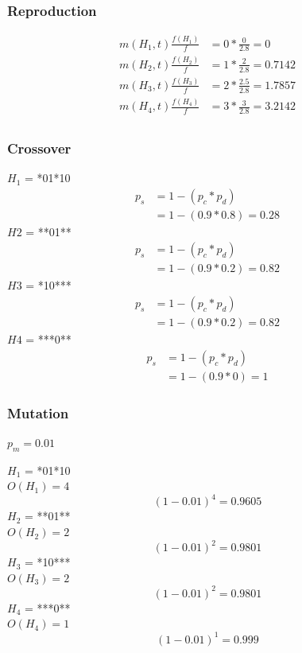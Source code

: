 \documentclass{article}
\begin{document}
\subsubsection*{Reproduction}
\begin{align*}
    m(H_1,t) \frac{f(H_1)}{f}&= 0 *\frac{0}{2.8} = 0\\
    m(H_2,t) \frac{f(H_2)}{f}&= 1 *\frac{2}{2.8} = 0.7142\\
    m(H_3,t) \frac{f(H_3)}{f}&= 2 *\frac{2.5}{2.8} = 1.7857\\
    m(H_4,t) \frac{f(H_4)}{f}&= 3 *\frac{3}{2.8} = 3.2142\\
\end{align*}

\subsubsection*{Crossover}
\begin{multicols}{2}
    $H_1$ = *01*10
    \begin{align*}
        p_s &= 1 - (p_c * p_d)\\
        &= 1 - (0.9 * 0.8) = 0.28
    \end{align*}
    $H2$ = **01**
    \begin{align*}
        p_s &= 1 - (p_c * p_d)\\
        &= 1 - (0.9 * 0.2) = 0.82
    \end{align*}
    $H3$ = *10***
    \begin{align*}
        p_s &= 1 - (p_c * p_d)\\
        &= 1 - (0.9 * 0.2) = 0.82
    \end{align*}
    $H4$ = ***0**
    \begin{align*}
        p_s &= 1 - (p_c * p_d)\\
        &= 1 - (0.9 * 0) = 1
    \end{align*}
\end{multicols}

\subsubsection*{Mutation}
$p_m = 0.01$
\begin{multicols}{2}
    $H_1$ = *01*10\\
    $O(H_1) = 4$
    \begin{equation*}
        (1-0.01)^4 = 0.9605
    \end{equation*}
    $H_2$ = **01**\\
    $O(H_2) = 2$
    \begin{equation*}
        (1-0.01)^2 = 0.9801
    \end{equation*}
    $H_3$ = *10***\\
    $O(H_3) = 2$
    \begin{equation*}
        (1-0.01)^2 = 0.9801
    \end{equation*}
    $H_4$ = ***0**\\
    $O(H_4) = 1$
    \begin{equation*}
        (1-0.01)^1 = 0.999
    \end{equation*}
\end{multicols}
\end{document}
